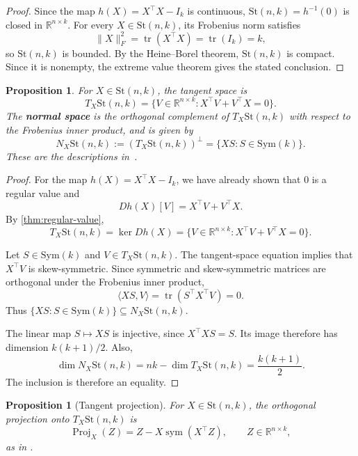 \documentclass[12pt]{article}
\theoremstyle{definition}
\theoremstyle{plain}
\newtheorem{proposition}[definition]{Proposition}
\theoremstyle{remark}
\newcommand{\R}{\mathbb{R}}
\newcommand{\St}{\mathrm{St} (n,k)}
\newcommand{\Sym}{\mathrm{Sym}}              %
\DeclareMathOperator{\sym}{sym}              %
\DeclareMathOperator{\tr}{tr}
\DeclareMathOperator{\Proj}{Proj}            %
\begin{document}
\begin{proof}
  Since the map \( h(X) = X^\top X - I_k \) is continuous, \( \St = h^{-1}(0) \) is closed in \( \R^{n \times k} \).
  For every \( X \in \St \), its Frobenius norm satisfies
  \[
    \|X\|_F^2 = \tr(X^\top X) = \tr(I_k) = k,
  \]
  so \( \St \) is bounded. By the Heine--Borel theorem, \( \St \) is compact. Since it is nonempty, the extreme value theorem gives the stated conclusion.
\end{proof}

\begin{proposition}\label{prop:stiefel-tangent-normal}
  For \( X \in \St \), the tangent space is
  \[
    T_X\St = \{V \in \R^{n \times k} : X^\top V + V^\top X = 0\}.
  \]
  The \textbf{normal space} is the orthogonal complement of \( T_X\St \) with respect to the Frobenius inner product, and is given by
  \[
    N_X\St := (T_X\St)^\perp = \{XS : S \in \Sym(k)\}.
  \]
  These are the descriptions in~\cite[Section 7.3, equations (7.17) and (7.25)]{boumal}.
\end{proposition}

\begin{proof}
  For the map \( h(X) = X^\top X - I_k \), we have already shown that \( 0 \) is a regular value and
  \[
    Dh(X)[V] = X^\top V + V^\top X.
  \]
  By \cref{thm:regular-value},
  \[
    T_X\St = \ker Dh(X) = \{V \in \R^{n \times k} : X^\top V + V^\top X = 0\}.
  \]

  Let \( S \in \Sym(k) \) and \( V \in T_X\St \).
  The tangent-space equation implies that \( X^\top V \) is skew-symmetric.
  Since symmetric and skew-symmetric matrices are orthogonal under the Frobenius inner product,
  \[
    \langle XS,V\rangle = \tr(S^\top X^\top V) = 0.
  \]
  Thus \( \{XS : S \in \Sym(k)\} \subseteq N_X\St \).

  The linear map \( S \mapsto XS \) is injective, since \( X^\top XS = S \). Its image therefore has dimension \( k(k+1)/2 \).
  Also,
  \[
    \dim N_X\St = nk - \dim T_X\St = \frac{k(k+1)}{2}.
  \]
  The inclusion is therefore an equality.
\end{proof}

\begin{proposition}[Tangent projection]\label{prop:stiefel-projection}
  For \( X \in \St \), the orthogonal projection onto \( T_X\St \) is
  \[
    \Proj_X(Z) = Z - X\sym(X^\top Z), \qquad Z \in \R^{n \times k},
  \]
  as in \cite[Section 7.3, equation (7.26)]{boumal}.
\end{proposition}
\end{document}
